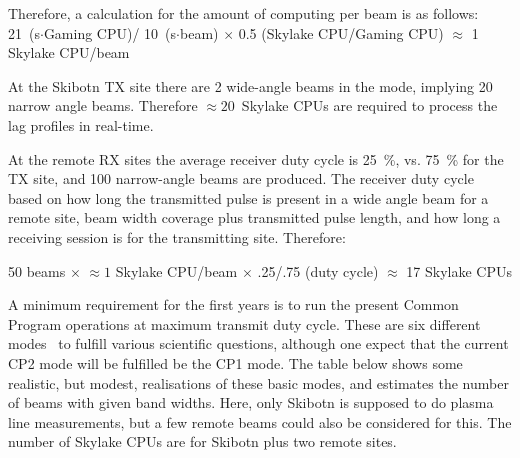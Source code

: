 \documentclass[12pt,a4paper]{article}
\begin{document}
Therefore, a calculation for the amount of computing per \NBW beam is as follows: \\
21~(s$\cdot$Gaming CPU)/ 10~(s$\cdot$beam) $\times$ 0.5 (Skylake CPU/Gaming CPU) $\approx$  1 Skylake CPU/beam

At the Skibotn TX site there are 2 wide-angle beams in the \NBW mode, implying 20 narrow angle beams.
Therefore $\approx 20$~Skylake CPUs are required to process the \NBW lag profiles in real-time.




At the remote RX sites the average receiver duty cycle is 25~\%, vs. 75~\% for the TX site, and 100 narrow-angle beams are produced. The receiver duty cycle based on how long the transmitted pulse is present in a wide angle beam for a remote site, beam width coverage plus transmitted pulse length, and how long a receiving session is for the transmitting site. Therefore:

50 beams $\times$ $\approx 1$ Skylake CPU/beam $\times$ .25/.75 (duty cycle) $\approx$ 17 Skylake CPUs

A minimum requirement for the first years is to run the present Common Program operations at maximum transmit duty cycle. 
These are six different modes~\cite{eiscat-cp1} to fulfill various scientific questions, although one expect that the current CP2 mode will be fulfilled be the \ED CP1 mode. 
The table below shows some realistic, but modest, realisations of these basic modes, and estimates the number of beams with given band widths. 
Here, only Skibotn is supposed to do plasma line measurements, but a few remote beams could also be considered for this. The number of Skylake CPUs are for Skibotn plus two remote sites.
\end{document}
